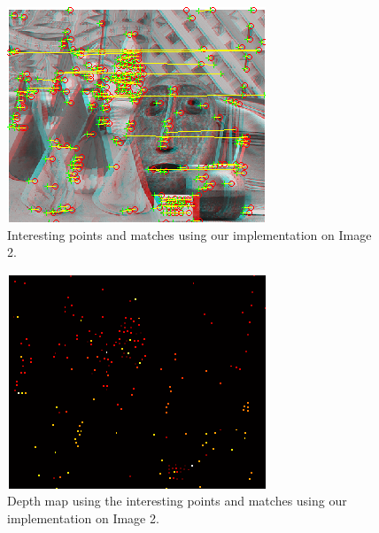 \begin{figure}[H]\centering
	\includegraphics[width=0.8\linewidth]{Images/02_our_match.png}
	\caption{Interesting points and matches using our implementation on Image 2.}
	\label{fig:cones-ours-match}
\end{figure}

\begin{figure}[H]\centering
	\includegraphics[width=0.8\linewidth]{Images/02_our_depth.png}
	\caption{Depth map using the interesting points and matches using our implementation on Image 2.}
	\label{fig:cones-ours-depth}
\end{figure}

